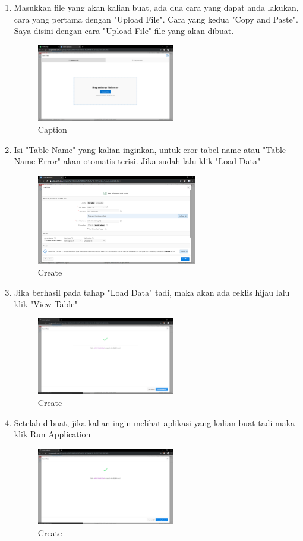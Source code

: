\documentclass{article}
\begin{document}
\begin{enumerate}
    \item Masukkan file yang akan kalian buat, ada dua cara yang dapat anda lakukan, cara yang pertama dengan "Upload File". Cara yang kedua "Copy and Paste". Saya disini dengan cara "Upload File" file yang akan dibuat.
     \begin{figure}[!htbp]
        \centering
        \includegraphics [width=6cm]{Figure/CF.png}
        \caption{Caption}
        \label{capture3}
    \end{figure}
    
    \item Isi "Table Name" yang kalian inginkan, untuk eror tabel name atau "Table Name Error" akan otomatis terisi. Jika sudah lalu klik "Load Data"
    \begin{figure}[h]
	\centering
	\includegraphics[width=7cm]{Figure/ID.png}
	\caption{Create}
	\label{fig:gambar}
	\end{figure}
	
    \item Jika berhasil pada tahap "Load Data" tadi, maka akan ada ceklis hijau lalu klik "View Table"
    \begin{figure}[h]
	\centering
	\includegraphics[width=6cm]{Figure/CA.png}
	\caption{Create}
	\label{fig:gambar}
	\end{figure}
	
	    \item Setelah dibuat, jika kalian ingin melihat aplikasi yang kalian buat tadi maka klik Run Application
    \begin{figure}[h]
	\centering
	\includegraphics[width=6cm]{Figure/CA.png}
	\caption{Create}
	\label{fig:gambar}
	\end{figure}
    

\end{enumerate}
\end{document}
